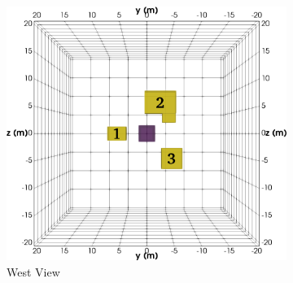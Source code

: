 \documentclass[preprint,authoryear,12pt]{elsarticle}
\begin{document}
\begin{figure}[htp]{}
   \begin{center}
      \begin{subfigure}{0.54\linewidth}
         \includegraphics[height=\ht0,keepaspectratio]{./figures/Fig10a.png}
         \caption{West View}
         \label{fig:StraightTunnel_MultiBlk_TrueMod_West}
      \end{subfigure}
      \hspace{-2.5cm}
      \qquad
      \begin{subfigure}{0.54\linewidth}

\end{subfigure}
\end{center}
\end{figure}
\end{document}
